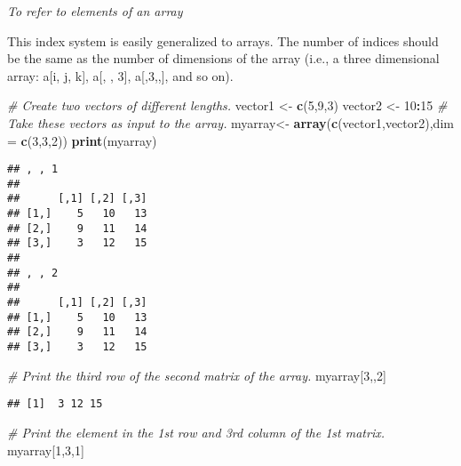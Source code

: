 \documentclass[]{book}
\newenvironment{Shaded}{\begin{snugshade}}{\end{snugshade}}
\newcommand{\KeywordTok}[1]{\textcolor[rgb]{0.13,0.29,0.53}{\textbf{#1}}}
\newcommand{\DataTypeTok}[1]{\textcolor[rgb]{0.13,0.29,0.53}{#1}}
\newcommand{\DecValTok}[1]{\textcolor[rgb]{0.00,0.00,0.81}{#1}}
\newcommand{\StringTok}[1]{\textcolor[rgb]{0.31,0.60,0.02}{#1}}
\newcommand{\CommentTok}[1]{\textcolor[rgb]{0.56,0.35,0.01}{\textit{#1}}}
\newcommand{\OperatorTok}[1]{\textcolor[rgb]{0.81,0.36,0.00}{\textbf{#1}}}
\newcommand{\NormalTok}[1]{#1}
\theoremstyle{definition}
\theoremstyle{definition}
\theoremstyle{definition}
\theoremstyle{remark}
\begin{document}
\emph{To refer to elements of an array}

This index system is easily generalized to arrays. The number of indices
should be the same as the number of dimensions of the array (i.e., a
three dimensional array: a{[}i, j, k{]}, a{[}, , 3{]}, a{[},3,,{]}, and
so on).

\begin{Shaded}
\begin{Highlighting}[]
\CommentTok{# Create two vectors of different lengths.}
\NormalTok{vector1 <-}\StringTok{ }\KeywordTok{c}\NormalTok{(}\DecValTok{5}\NormalTok{,}\DecValTok{9}\NormalTok{,}\DecValTok{3}\NormalTok{)}
\NormalTok{vector2 <-}\StringTok{ }\DecValTok{10}\OperatorTok{:}\DecValTok{15}
\CommentTok{# Take these vectors as input to the array.}
\NormalTok{myarray<-}\StringTok{ }\KeywordTok{array}\NormalTok{(}\KeywordTok{c}\NormalTok{(vector1,vector2),}\DataTypeTok{dim =} \KeywordTok{c}\NormalTok{(}\DecValTok{3}\NormalTok{,}\DecValTok{3}\NormalTok{,}\DecValTok{2}\NormalTok{))}
\KeywordTok{print}\NormalTok{(myarray)}
\end{Highlighting}
\end{Shaded}

\begin{verbatim}
## , , 1
## 
##      [,1] [,2] [,3]
## [1,]    5   10   13
## [2,]    9   11   14
## [3,]    3   12   15
## 
## , , 2
## 
##      [,1] [,2] [,3]
## [1,]    5   10   13
## [2,]    9   11   14
## [3,]    3   12   15
\end{verbatim}

\begin{Shaded}
\begin{Highlighting}[]
\CommentTok{# Print the third row of the second matrix of the array.}
\NormalTok{myarray[}\DecValTok{3}\NormalTok{,,}\DecValTok{2}\NormalTok{]}
\end{Highlighting}
\end{Shaded}

\begin{verbatim}
## [1]  3 12 15
\end{verbatim}

\begin{Shaded}
\begin{Highlighting}[]
\CommentTok{# Print the element in the 1st row and 3rd column of the 1st matrix.}
\NormalTok{myarray[}\DecValTok{1}\NormalTok{,}\DecValTok{3}\NormalTok{,}\DecValTok{1}\NormalTok{]}
\end{Highlighting}
\end{Shaded}
\end{document}
